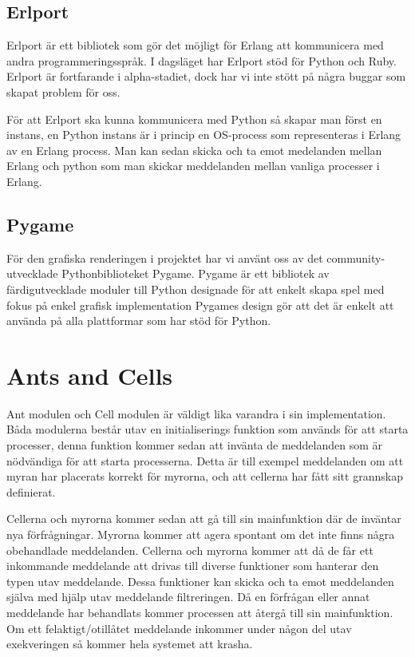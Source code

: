 \subsection{Erlport}

Erlport är ett bibliotek som gör det möjligt för Erlang att kommunicera med andra programmeringsspråk. I dagsläget har Erlport stöd för Python och Ruby. Erlport är fortfarande i alpha-stadiet, dock har vi inte stött på några buggar som skapat problem för oss. 

För att Erlport ska kunna kommunicera med Python så skapar man först en instans, en Python instans är i princip en OS-process som representeras i Erlang av en Erlang process. Man kan sedan skicka och ta emot medelanden mellan Erlang och python som man skickar meddelanden mellan vanliga processer i Erlang.

\subsection{Pygame}

För den grafiska renderingen i projektet har vi använt oss av det community-utvecklade Pythonbiblioteket Pygame. Pygame är ett bibliotek av färdigutvecklade moduler till Python designade för att enkelt skapa spel med fokus på enkel grafisk implementation Pygames design gör att det är enkelt att använda på alla plattformar som har stöd för Python.

\section{Ants and Cells}

Ant modulen och Cell modulen är väldigt lika varandra i sin implementation. Båda modulerna består utav en initialiserings funktion som används för att starta processer, denna funktion kommer sedan att invänta de meddelanden som är nödvändiga för att starta processerna. Detta är till exempel meddelanden om att myran har placerats korrekt för myrorna, och att cellerna har fått sitt grannskap definierat.

Cellerna och myrorna kommer sedan att gå till sin mainfunktion där de inväntar nya förfrågningar.  Myrorna kommer att agera spontant om det inte finns några obehandlade meddelanden. Cellerna och myrorna kommer att då de får ett inkommande meddelande att drivas till diverse funktioner som hanterar den typen utav meddelande. Dessa funktioner kan skicka och ta emot meddelanden själva med hjälp utav meddelande filtreringen. Då en förfrågan eller annat meddelande har behandlats kommer processen att återgå till sin mainfunktion. Om ett felaktigt/otillåtet meddelande inkommer under någon del utav exekveringen så kommer hela systemet att krasha.

